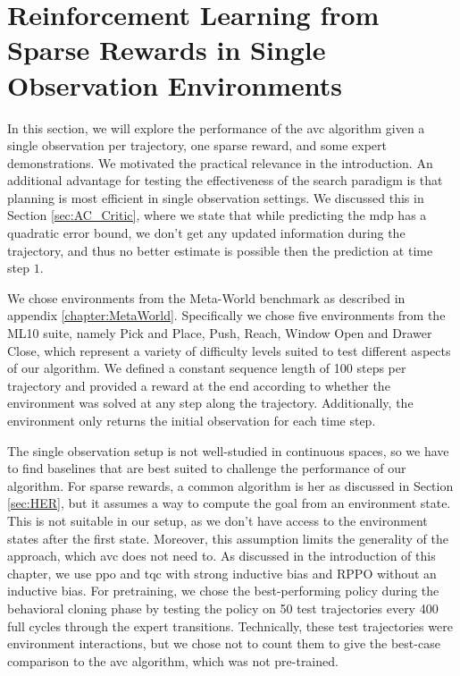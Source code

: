 \section{Reinforcement Learning from Sparse Rewards in Single Observation Environments}
In this section, we will explore the performance of the \ac{avc} algorithm given a single observation per trajectory, one sparse reward, and some expert demonstrations.
We motivated the practical relevance in the introduction. An additional advantage for testing the effectiveness of the search paradigm is that planning is most efficient in
single observation settings.
We discussed this in Section \ref{sec:AC_Critic}, where we state that while predicting the \ac{mdp} has a quadratic error bound, we don't get any updated information
during the trajectory, and thus no better estimate is possible then the prediction at time step $1$. 

We chose environments from the Meta-World benchmark as described in appendix \ref{chapter:MetaWorld}. 
Specifically we chose five environments from the ML10 suite, namely Pick and Place, Push, Reach, Window Open and Drawer Close, which represent a variety
of difficulty levels suited to test different aspects of our algorithm. We defined a constant sequence length of 100 steps per trajectory and provided
a reward at the end according to whether the environment was solved at any step along the trajectory. Additionally, the environment
only returns the initial observation for each time step.

The single observation setup is not well-studied in continuous spaces, so we have to find baselines that are best suited to challenge the performance of our algorithm. For sparse rewards, a common
algorithm is \ac{her} as discussed in Section \ref{sec:HER}, but it assumes a way to compute the goal from an environment state. This is not suitable in our setup, as we don't have access to the environment
states after the first state. Moreover, this assumption limits the generality of the approach, which \ac{avc} does not need to.
As discussed in the introduction of this chapter, we use \ac{ppo} and \ac{tqc} with strong inductive bias and RPPO without an inductive bias. 
For pretraining, we chose the best-performing policy during the behavioral cloning phase by testing the policy on 50 test 
trajectories every 400 full cycles through the 
expert transitions. Technically, these test trajectories were environment interactions, but we chose not to count them to give the best-case comparison to the \ac{avc} algorithm, which was not pre-trained.

